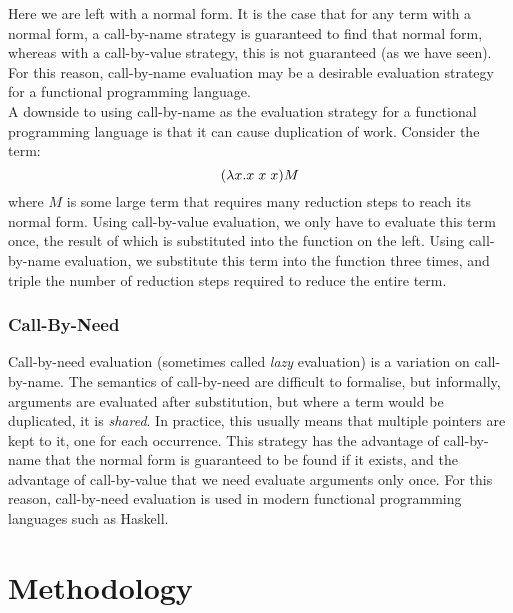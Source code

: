 \documentclass{article}
\begin{document}
Here we are left with a normal form. It is the case that for any term with a normal form, a call-by-name strategy is guaranteed to find that normal form, whereas with a call-by-value strategy, this is not guaranteed (as we have seen). For this reason, call-by-name evaluation may be a desirable evaluation strategy for a functional programming language.
\\\indent A downside to using call-by-name as the evaluation strategy for a functional programming language is that it can cause duplication of work. Consider the term:
\[ (\lambda x.x \hspace{1mm} x \hspace{1mm} x)M \]
where $M$ is some large term that requires many reduction steps to reach its normal form. Using call-by-value evaluation, we only have to evaluate this term once, the result of which is substituted into the function on the left. Using call-by-name evaluation, we substitute this term into the function three times, and triple the number of reduction steps required to reduce the entire term.
\subsubsection{Call-By-Need}
Call-by-need evaluation (sometimes called \emph{lazy} evaluation) is a variation on call-by-name. The semantics of call-by-need are difficult to formalise, but informally, arguments are evaluated after substitution, but where a term would be duplicated, it is \emph{shared}. In practice, this usually means that multiple pointers are kept to it, one for each occurrence. This strategy has the advantage of call-by-name that the normal form is guaranteed to be found if it exists, and the advantage of call-by-value that we need evaluate arguments only once. For this reason, call-by-need evaluation is used in modern functional programming languages such as Haskell.

\pagebreak
\section{Methodology}
\end{document}
